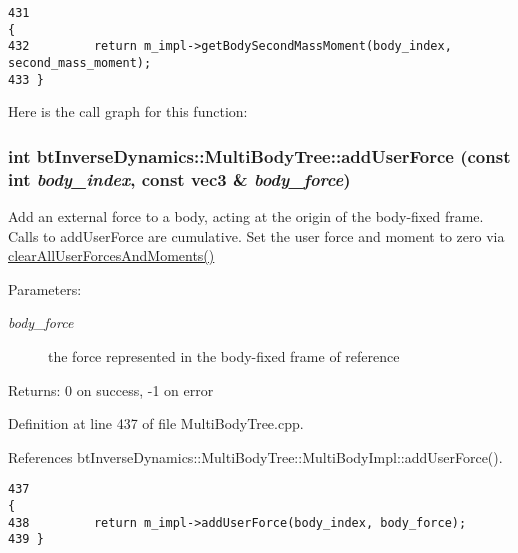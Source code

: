 \begin{Code}\begin{verbatim}431                                                                                                 {
432         return m_impl->getBodySecondMassMoment(body_index, second_mass_moment);
433 }
\end{verbatim}
\end{Code}




Here is the call graph for this function:\hypertarget{classbt_inverse_dynamics_1_1_multi_body_tree_629ed5024a2d1cb7500ebe935231f5e8}{
\subsubsection[addUserForce]{\setlength{\rightskip}{0pt plus 5cm}int btInverseDynamics::MultiBodyTree::addUserForce (const int {\em body\_\-index}, \/  const {\bf vec3} \& {\em body\_\-force})}}
\label{classbt_inverse_dynamics_1_1_multi_body_tree_629ed5024a2d1cb7500ebe935231f5e8}


Add an external force to a body, acting at the origin of the body-fixed frame. Calls to addUserForce are cumulative. Set the user force and moment to zero via \hyperlink{classbt_inverse_dynamics_1_1_multi_body_tree_66402f51ab131c39a4d309196ff7c743}{clearAllUserForcesAndMoments()} \begin{Desc}
\item[Parameters:]
\begin{description}
\item[{\em body\_\-force}]the force represented in the body-fixed frame of reference \end{description}
\end{Desc}
\begin{Desc}
\item[Returns:]0 on success, -1 on error \end{Desc}


Definition at line 437 of file MultiBodyTree.cpp.

References btInverseDynamics::MultiBodyTree::MultiBodyImpl::addUserForce().

\begin{Code}\begin{verbatim}437                                                                             {
438         return m_impl->addUserForce(body_index, body_force);
439 }
\end{verbatim}
\end{Code}




